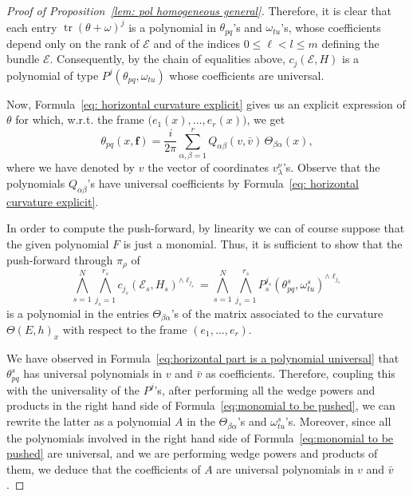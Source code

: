 \documentclass[a4paper]{amsart}
\theoremstyle{plain}%
\theoremstyle{definition}
\theoremstyle{remark}
\begin{document}
\begin{proof}[Proof of Proposition~\ref{lem: pol homogeneous general}]
	Therefore, it is clear that each entry $ \operatorname{tr}(\theta + \omega)^{j} $ is a polynomial in $ \theta_{pq} $'s and $ \omega_{tu} $'s, whose coefficients depend only on the rank of $ \mathcal{E} $ and of the indices $ 0 \le \ell < l \le m $ defining the bundle $ \mathcal{E} $.
	Consequently, by the chain of equalities above, $ c_{j}(\mathcal{E},H) $ is a polynomial of type $ P^{j}(\theta_{pq}, \omega_{tu}) $ whose coefficients are universal.
	
	Now, Formula~\ref{eq: horizontal curvature explicit} gives us an explicit expression of $ \theta $ for which, w.r.t. the frame $ \big( e_1(x),\dots,e_r(x) \big) $, we get
	\begin{equation}\label{eq:horizontal part is a polynomial universal}
		\theta_{pq}(x,\mathbf{f}) =  \frac{i}{2\pi} \sum_{\alpha,\beta=1}^{r} Q_{\alpha\beta}(v,\bar{v}) \, \Theta_{\beta \alpha}(x) ,
	\end{equation}
	where we have denoted by $ v $ the vector of coordinates $ v_{\lambda}^{\nu} $'s.
	Observe that the polynomials $ Q_{\alpha\beta} $'s have universal coefficients by Formula~\ref{eq: horizontal curvature explicit}.
	
	In order to compute the push-forward, by linearity we can of course suppose that the given polynomial $ F $ is just a monomial.
	Thus, it is sufficient to show that the push-forward through $ \pi_{\rho} $ of
	\begin{equation}\label{eq:monomial to be pushed}
		\bigwedge_{s=1}^{N} \bigwedge_{j_s=1}^{r_s} c_{j_s}(\mathcal{E}_s,H_s)^{\wedge \ell_{j_s}} = \bigwedge_{s=1}^{N} \bigwedge_{j_s=1}^{r_s} {P_{s}^{j_s}(\theta_{pq}^{s}, \omega_{tu}^{s})}^{\wedge \ell_{j_s}}
	\end{equation}
	is a polynomial in the entries $\Theta_{\beta\alpha}$'s of the matrix associated to the curvature $\Theta(E,h)_x$ with respect to the frame $ (e_1,\dots,e_r )$.
	
	We have observed in Formula~\eqref{eq:horizontal part is a polynomial universal} that $ \theta_{pq}^{s} $ has universal polynomials in $ v $ and $ \bar{v} $ as coefficients.
	Therefore, coupling this with the universality of the $ P^j $'s, after performing all the wedge powers and products in the right hand side of Formula~\eqref{eq:monomial to be pushed}, we can rewrite the latter as a polynomial $ A $ in the $ \Theta_{\beta\alpha} $'s and $ \omega_{tu}^{s} $'s.
	Moreover, since all the polynomials involved in the right hand side of Formula~\eqref{eq:monomial to be pushed} are universal, and we are performing wedge powers and products of them, we deduce that the coefficients of $ A $ are universal polynomials in $ v $ and $ \bar{v} $.
	

\end{proof}
\end{document}
